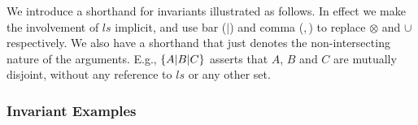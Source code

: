 We introduce a shorthand for invariants illustrated as follows.
In effect we make the involvement of $ls$ implicit,
and use bar ($|$) and comma ($,$) to replace $\otimes$ and $\cup$ respectively.
We also have a shorthand that just denotes
the non-intersecting nature of the arguments.
E.g.,
$\{A|B|C\}$ asserts that $A$, $B$ and $C$ are mutually disjoint,
without any reference to $ls$ or any other set.

\subsubsection{Invariant Examples}

